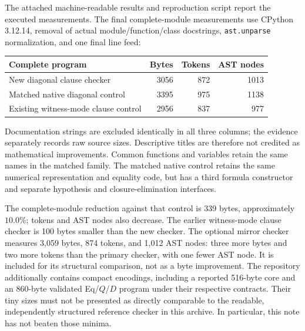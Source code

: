 \documentclass[11pt]{article}
\theoremstyle{definition}\newtheorem{definition}[theorem]{Definition}
\theoremstyle{remark}\newtheorem{remark}[theorem]{Remark}
\begin{document}
The attached machine-readable results and reproduction script report the executed measurements. The final complete-module measurements use CPython 3.12.14, removal of actual module/function/class docstrings, \texttt{ast.unparse} normalization, and one final line feed:
\begin{center}
\begin{tabular}{lrrr}
\toprule
Complete program & Bytes & Tokens & AST nodes\\
\midrule
New diagonal clause checker & 3056 & 872 & 1013\\
Matched native diagonal control & 3395 & 975 & 1138\\
Existing witness-mode clause control & 2956 & 837 & 977\\
\bottomrule
\end{tabular}
\end{center}
Documentation strings are excluded identically in all three columns; the evidence separately records raw source sizes. Descriptive titles are therefore not credited as mathematical improvements. Common functions and variables retain the same names in the matched family. The matched native control retains the same numerical representation and equality code, but has a third formula constructor and separate hypothesis and closure-elimination interfaces.

The complete-module reduction against that control is 339 bytes, approximately $10.0\%$; tokens and AST nodes also decrease. The earlier witness-mode clause checker is 100 bytes smaller than the new checker. The optional mirror checker measures 3,059 bytes, 874 tokens, and 1,012 AST nodes: three more bytes and two more tokens than the primary checker, with one fewer AST node. It is included for its structural comparison, not as a byte improvement. The repository additionally contains compact encodings, including a reported 516-byte core and an 860-byte validated Eq/$Q$/$D$ program under their respective contracts. Their tiny sizes must not be presented as directly comparable to the readable, independently structured reference checker in this archive. In particular, this note has not beaten those minima.
\end{document}
